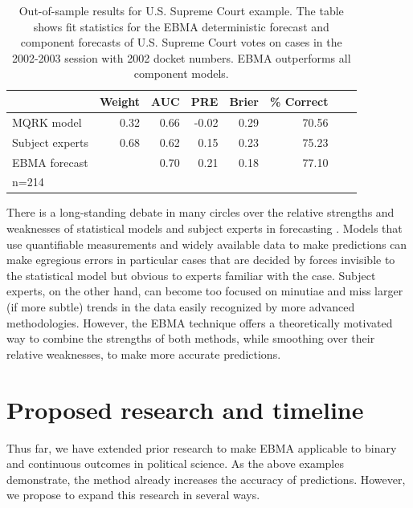 \documentclass[pdftex,12pt,fullpage,oneside]{amsart}
\begin{document}
\begin{table}
\vspace{-5pt}
  \caption{\footnotesize Out-of-sample results for U.S. Supreme Court
    example.  The table shows fit statistics for the EBMA deterministic
    forecast and component forecasts of U.S. Supreme Court votes on
    cases in the 2002-2003 session with 2002 docket numbers.   EBMA
    outperforms all component models. }
\label{SC-Res} \small
\begin{center}
\begin{tabular}{lrrrrrrr}
\toprule
 & Weight & AUC & PRE & Brier & \% Correct   \\ 
\midrule
MQRK model& 0.32  & 0.66 & -0.02 & 0.29 & 70.56   \\ 
Subject experts & 0.68 & 0.62 & 0.15 & 0.23 & 75.23  \\ 
EBMA forecast&  & 0.70 & 0.21 & 0.18 & 77.10  \\ 
\bottomrule
n=214 
\end{tabular}
\end{center}
\vspace{-15pt}
\end{table}


There is a long-standing debate in many circles over the relative
strengths and weaknesses of statistical models and subject experts in
forecasting \citep[e.g.,][]{Ascher:1979}.  Models that use
quantifiable measurements and widely available data to make
predictions can make egregious errors in particular cases that are
decided by forces invisible to the statistical model but obvious to
experts familiar with the case.  Subject experts, on the other hand,
can become too focused on minutiae and miss larger (if more subtle)
trends in the data easily recognized by more advanced methodologies.
However, the EBMA technique offers a theoretically motivated way to
combine the strengths of both methods, while smoothing over their
relative weaknesses, to make more accurate predictions.

\section{Proposed research and timeline}

Thus far, we have extended prior research to make EBMA applicable to
binary and continuous outcomes in political science.  As the above
examples demonstrate, the method already increases the accuracy of
predictions.  However, we propose to expand this research in several
ways.
\end{document}
